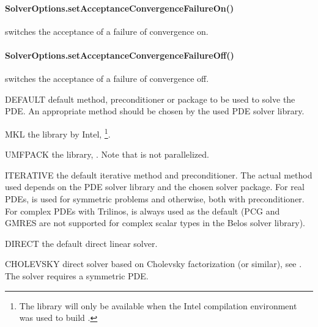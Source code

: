 \paragraph{SolverOptions.setAcceptanceConvergenceFailureOn()}
switches the acceptance of a failure of convergence on.


\paragraph{SolverOptions.setAcceptanceConvergenceFailureOff()}
switches the acceptance of a failure of convergence off.

    
\begin{memberdesc}[SolverOptions]{DEFAULT}
default method, preconditioner or package to be used to solve the PDE.
An appropriate method should be chosen by the used PDE solver library.
\end{memberdesc}

\begin{memberdesc}[SolverOptions]{MKL}
the \MKL library by Intel, \footnote{The \MKL library will only be
available when the Intel compilation environment was used to build \escript.}.
\end{memberdesc}

\begin{memberdesc}[SolverOptions]{UMFPACK}
the \UMFPACK library, . Note that \UMFPACK is not parallelized.
\end{memberdesc}

\begin{memberdesc}[SolverOptions]{ITERATIVE}
the default iterative method and preconditioner. The actual method used
depends on the PDE solver library and the chosen solver package.
For real PDEs, \PCG is used for symmetric problems and \BiCGStab otherwise, both with
\JACOBI preconditioner.
For complex PDEs with Trilinos, \BiCGStab is always used as the default
(PCG and GMRES are not supported for complex scalar types in the Belos solver library).
\end{memberdesc}

\begin{memberdesc}[SolverOptions]{DIRECT}
the default direct linear solver.
\end{memberdesc}

\begin{memberdesc}[SolverOptions]{CHOLEVSKY}
direct solver based on Cholevsky factorization (or similar), see .
The solver requires a symmetric PDE.
\end{memberdesc}

